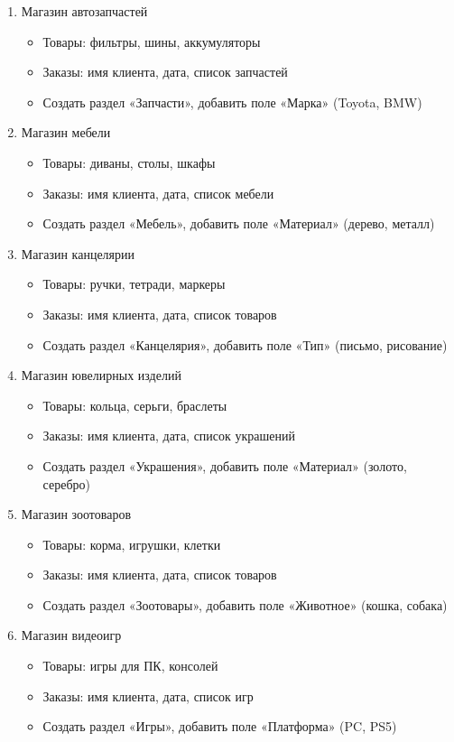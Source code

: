 \documentclass[12pt]{article}
\numberwithin{listing}{section}
\numberwithin{figure}{section}
\begin{document}
\begin{enumerate}
\item Магазин автозапчастей
\begin{itemize}
	\item Товары: фильтры, шины, аккумуляторы
	\item Заказы: имя клиента, дата, список запчастей
	\item Создать раздел «Запчасти», добавить поле «Марка» (Toyota, BMW)
\end{itemize}

\item Магазин мебели
\begin{itemize}
	\item Товары: диваны, столы, шкафы
	\item Заказы: имя клиента, дата, список мебели
	\item Создать раздел «Мебель», добавить поле «Материал» (дерево, металл)
\end{itemize}

\item Магазин канцелярии
\begin{itemize}
	\item Товары: ручки, тетради, маркеры
	\item Заказы: имя клиента, дата, список товаров
	\item Создать раздел «Канцелярия», добавить поле «Тип» (письмо, рисование)
\end{itemize}

\item Магазин ювелирных изделий
\begin{itemize}
	\item Товары: кольца, серьги, браслеты
	\item Заказы: имя клиента, дата, список украшений
	\item Создать раздел «Украшения», добавить поле «Материал» (золото, серебро)
\end{itemize}

\newpage

\item Магазин зоотоваров
\begin{itemize}
	\item Товары: корма, игрушки, клетки
	\item Заказы: имя клиента, дата, список товаров
	\item Создать раздел «Зоотовары», добавить поле «Животное» (кошка, собака)
\end{itemize}

\item Магазин видеоигр
\begin{itemize}
	\item Товары: игры для ПК, консолей
	\item Заказы: имя клиента, дата, список игр
	\item Создать раздел «Игры», добавить поле «Платформа» (PC, PS5)
\end{itemize}


\end{enumerate}
\end{document}
